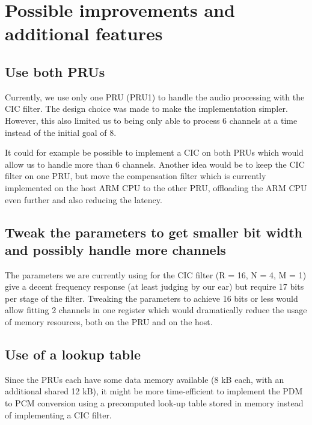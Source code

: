 \documentclass[]{report}
\begin{document}
\hypertarget{possible-improvements-and-additional-features}{%
\chapter{Possible improvements and additional
features}\label{possible-improvements-and-additional-features}}

\hypertarget{use-both-prus}{%
\section{Use both PRUs}\label{use-both-prus}}

Currently, we use only one PRU (PRU1) to handle the audio processing with the CIC filter. The design choice was made to make the implementation simpler. However, this also limited us to being only able to process 6 channels at a time instead of the initial goal of 8.

It could for example be possible to implement a CIC on both PRUs which would allow us to handle more than 6 channels. Another idea would be to keep the CIC filter on one PRU, but move the compensation filter which is currently implemented on the host ARM CPU to the other PRU, offloading the ARM CPU even further and also reducing the latency.

\hypertarget{tweak-the-parameters-to-get-smaller-bit-width-and-possibly-handle-more-channels}{%
\section{Tweak the parameters to get smaller bit width and possibly
handle more
channels}\label{tweak-the-parameters-to-get-smaller-bit-width-and-possibly-handle-more-channels}}

The parameters we are currently using for the CIC filter (R = 16, N = 4, M = 1) give a decent frequency response (at least judging by our ear) but require 17 bits per stage of the filter. Tweaking the parameters to achieve 16 bits or less would allow fitting 2 channels in one register which would dramatically reduce the usage of memory resources, both on the PRU and on the host.


\hypertarget{use-of-a-lookup-table}{%
\section{Use of a lookup table}\label{use-of-a-lookup-table}}

Since the PRUs each have some data memory available (8 kB each, with an additional shared 12 kB), it might be more time-efficient to implement the PDM to PCM conversion using a precomputed look-up table stored in memory instead of implementing a CIC filter.
\end{document}
